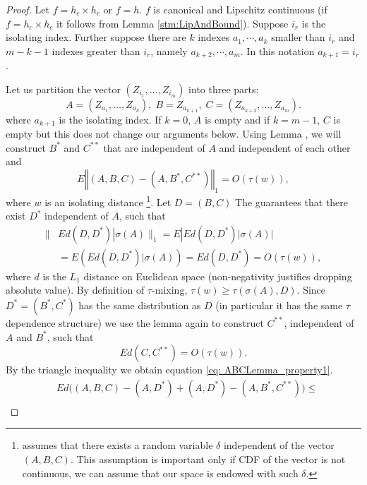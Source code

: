 \documentclass{article} %
\newcommand{\ev}{E}
\begin{document}
\begin{proof}
Let $f = h_c \times h_c$ or $f=h$. $f$ is canonical and Lipschitz continuous (if $f = h_c \times h_c$ it follows from  Lemma \ref{stm:LipAndBound}).   Suppose $i_r$ is  the isolating index. Further suppose there are $k$  indexes $a_1,\cdots ,a_k$ smaller than $i_r$ and $m-k-1$ indexes greater than $i_r$, namely $a_{k+2}, \cdots , a_m$. In this  notation $a_{k+1}=i_r$.   

Let us partition the vector $\left(Z_{i_{1}},\ldots,Z_{i_{m}}\right)$ into three parts:
\begin{equation*}
A =  \left(Z_{a_{1}},\ldots,Z_{a_{k}}\right),\; B=Z_{a_{k+1}},\; C=\left(Z_{a_{k+2}},\ldots,Z_{a_{m}}\right).
\end{equation*}
where $a_{k+1}$ is the isolating index. If $k=0$, $A$ is empty and if $k=m-1$, $C$ is empty but this does not change our arguments below. Using
Lemma \cite[Lemma 5.3]{dedecker2007weak}, we will construct $B^{*}$ and $C^{**}$ that are independent
of $A$ and independent of each other and 
\begin{equation}
\ev \left\Vert \left(A,B,C\right)-\left(A,B^{*},C^{**}\right)\right\Vert _{1} =  O(\tau\left(w\right)), \label{eq: ABCLemma_property1}
\end{equation}
where $w$ is an isolating distance \footnote{ \cite[Lemma 5.3]{dedecker2007weak}   assumes that there exists a random variable $\delta$ independent of the vector $(A,B,C)$. This assumption is important only if CDF of the vector is not continuous, we can assume that our space is endowed with such $\delta$.}.  Let $D=(B,C)$ The \cite[Lemma 5.3]{dedecker2007weak}  guarantees that there exist $D^*$ independent of $A$, such that 
\begin{align*}
 \|& \ev d(D,D^*) | \sigma(A) \|_1 = \ev |  \ev d(D,D^*) | \sigma(A) | \\
 &= \ev   (\ev d(D,D^*) | \sigma(A)) = \ev d(D,D^*) = O(\tau(w)),
\end{align*}
where $d$ is the $L_1$ distance on Euclidean space (non-negativity justifies dropping absolute value). By definition of  $\tau$-mixing, $\tau(w) \geq \tau(\sigma(A),D )$. Since  $D^*=(B^*,C^*)$ has the same distribution as $D$ (in particular it has the same $\tau$ dependence structure) we use the lemma again to construct $C^{**}$, independent of $A$ and $B^*$, such that 
\[
  \ev d(C,C^{**}) =  O(\tau(w)).
\]
By the triangle inequality we obtain equation \ref{eq: ABCLemma_property1}. 
\begin{align*}
&\ev  d \big( (A,B,C) - (A,D^*) + (A,D^*) - (A,B^*,C^{**}) \big) \leq \\

\end{align*}
\end{proof}
\end{document}
